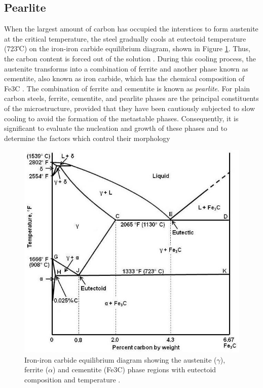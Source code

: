 \documentclass[12pt]{report}
\begin{document}
\subsection{Pearlite} 
When the largest amount of carbon has occupied the interstices to form austenite at the critical temperature, the steel gradually cools at eutectoid temperature (723℃) on the iron-iron carbide equilibrium diagram, shown in Figure \ref{ch3:figure:equilibrium}. Thus, the carbon content is forced out of the solution \cite{bhadeshia2017steels}. During this cooling process, the austenite transforms into a combination of ferrite and another phase known as cementite, also known as iron carbide, which has the chemical composition of Fe3C \cite{cmrp2014maintenance}. The combination of ferrite and cementite is known as \emph{pearlite}.  
For plain carbon steels, ferrite, cementite, and pearlite phases are the principal constituents of the microstructure, provided that they have been cautiously subjected to slow cooling to avoid the formation of the metastable phases. Consequently, it is significant to evaluate the nucleation and growth of these phases and to determine the factors which control their morphology \cite{bhadeshia2017steels}

\begin{figure}[H]
    \centering
    \includegraphics[width=\textwidth]{iron-iron_carbide_equilibrium_diagram.jpg}
    \caption{Iron-iron carbide equilibrium diagram showing the austenite ($\gamma$), ferrite ($\alpha$) and cementite (Fe3C) phase regions with eutectoid composition and temperature \cite{cmrp2014maintenance}.}
    \label{ch3:figure:equilibrium}
\end{figure}
\end{document}
